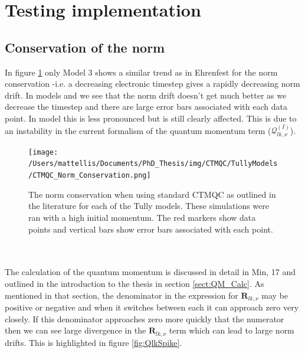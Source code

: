 \section{Testing  implementation}
\subsection{Conservation of the norm}
In figure \ref{fig:CTMQCNormCons} only Model 3 shows a similar trend as in Ehrenfest for the norm conservation -i.e. a decreasing electronic timestep gives a rapidly decreasing norm drift. In models  and  we see that the norm drift doesn't get much better as we decrease the timestep and there are large error bars associated with each data point. In model  this is less pronounced but is still clearly affected. This is due to an instability in the current formalism of the quantum momentum term ($\mathcal{Q}_{lk, \nu}^{(I)}$).
\begin{figure}[ht]
	\texttt{[image: /Users/mattellis/Documents/PhD\_Thesis/img/CTMQC/TullyModels/CTMQC\_Norm\_Conservation.png]}
	\caption{\label{fig:CTMQCNormCons}The norm conservation when using standard CTMQC as outlined in the literature for each of the Tully models. These simulations were ran with a high initial momentum. The red markers show data points and vertical bars show error bars associated with each point.}
\end{figure}
\\\\
The calculation of the quantum momentum is discussed in detail in Min, 17 \cite{min_ab_2017} and outlined in the introduction to the thesis in section \ref{sect:QM_Calc}. As mentioned in that section, the denominator in the expression for $\mathbf{R}_{lk, \nu}$ may be positive or negative and when it switches between each it can approach zero very closely. If this denominator approaches zero more quickly that the numerator then we can see large divergence in the $\mathbf{R}_{lk, \nu}$ term which can lead to large norm drifts. This is highlighted in figure \ref{fig:QlkSpike}.

